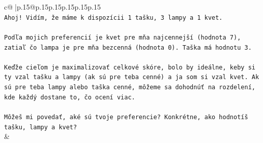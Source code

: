 \documentclass{article}
\begin{document}
{\begin{supertabular}{c@{$\;$}|p{.15\linewidth}@{}p{.15\linewidth}p{.15\linewidth}p{.15\linewidth}p{.15\linewidth}p{.15\linewidth}}
{{{\\ 
\texttt{Ahoj! Vidím, že máme k dispozícii 1 tašku, 3 lampy a 1 kvet.} \\
\\ 
\texttt{Podľa mojich preferencií je kvet pre mňa najcennejší (hodnota 7), zatiaľ čo lampa je pre mňa bezcenná (hodnota 0). Taška má hodnotu 3.} \\
\\ 
\texttt{Keďže cieľom je maximalizovať celkové skóre, bolo by ideálne, keby si ty vzal tašku a lampy (ak sú pre teba cenné) a ja som si vzal kvet. Ak sú pre teba lampy alebo taška cenné, môžeme sa dohodnúť na rozdelení, kde každý dostane to, čo ocení viac.} \\
\\ 
\texttt{Môžeš mi povedať, aké sú tvoje preferencie? Konkrétne, ako hodnotíš tašku, lampy a kvet?} \\
            }
        }
    }
    & \\ \\


\end{supertabular}}
\end{document}

